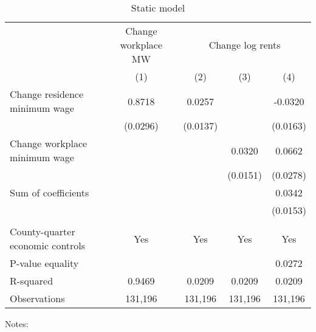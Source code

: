 \begin{table}
    \caption{Static model}
    \label{tab:static}

    \begin{tabular}{l*{4}{c}}
        \toprule
        & \multicolumn{1}{c}{Change workplace MW}
            & \multicolumn{3}{c}{Change log rents}                            \\ \cmidrule(lr){2-2}\cmidrule(lr){3-5}
                                        & (1)   & (2)   & (3)   & (4)      \\ \midrule
        Change residence minimum wage      &  0.8718  &  0.0257  &       &  -0.0320     \\
                                        & (0.0296) & (0.0137) &       & (0.0163)    \\
        Change workplace minimum wage      &       &       &  0.0320  & 0.0662      \\
                                        &       &       & (0.0151) & (0.0278)    \\ \midrule
        Sum of coefficients                &       &       &       &  0.0342     \\
                                        &       &       &       & (0.0153)    \\
                                        &       &       &       &          \\ \midrule
        County-quarter economic controls   &  Yes  & Yes   & Yes   & Yes      \\
        P-value equality                   &       &       &       & 0.0272      \\
        R-squared                          &  0.9469  &  0.0209  &  0.0209  & 0.0209      \\
        Observations                       & 131,196  & 131,196  & 131,196  & 131,196     \\\bottomrule
    \end{tabular}

    \begin{minipage}{.95\textwidth} \footnotesize
        \vspace{2mm}
        Notes: 
    \end{minipage}
\end{table}
